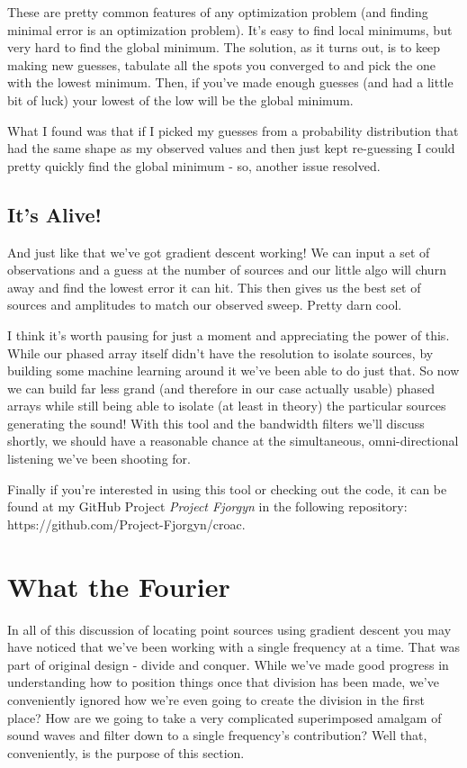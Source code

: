 \documentclass[12pt,a6paper]{book}
\begin{document}
These are pretty common features of any optimization problem (and finding minimal error is an optimization problem). It's easy to find local minimums, but very hard to find the global minimum. The solution, as it turns out, is to keep making new guesses, tabulate all the spots you converged to and pick the one with the lowest minimum. Then, if you've made enough guesses (and had a little bit of luck) your lowest of the low will be the global minimum. 

What I found was that if I picked my guesses from a probability distribution that had the same shape as my observed values and then just kept re-guessing I could pretty quickly find the global minimum - so, another issue resolved. 

\section{It's Alive!}

And just like that we've got gradient descent working! We can input a set of observations and a guess at the number of sources and our little algo will churn away and find the lowest error it can hit. This then gives us the best set of sources and amplitudes to match our observed sweep. Pretty darn cool. 

I think it's worth pausing for just a moment and appreciating the power of this. While our phased array itself didn't have the resolution to isolate sources, by building some machine learning around it we've been able to do just that. So now we can build far less grand (and therefore in our case actually usable) phased arrays while still being able to isolate (at least in theory) the particular sources generating the sound! With this tool and the bandwidth filters we'll discuss shortly, we should have a reasonable chance at the simultaneous, omni-directional listening we've been shooting for. 

Finally if you're interested in using this tool or checking out the code, it can be found at my GitHub Project \textit{Project Fjorgyn} in the following repository: https://github.com/Project-Fjorgyn/croac.

\newpage

\chapter{What the Fourier}
In all of this discussion of locating point sources using gradient descent you may have noticed that we've been working with a single frequency at a time. That was part of original design - divide and conquer. While we've made good progress in understanding how to position things once that division has been made, we've conveniently ignored how we're even going to create the division in the first place? How are we going to take a very complicated superimposed amalgam of sound waves and filter down to a single frequency's contribution? Well that, conveniently, is the purpose of this section.
\end{document}
